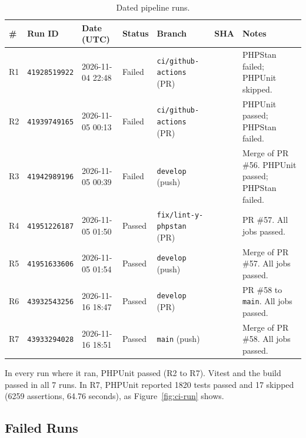 \begin{table}[H]
  \centering
  \small
  \setlength{\tabcolsep}{3pt}
  \begin{tabularx}{\linewidth}{L{0.7cm}L{2.3cm}L{2.1cm}L{1.3cm}L{2.7cm}L{1.4cm}Y}
    \toprule
    \# & Run ID & Date (UTC) & Status & Branch & SHA & Notes \\
    \midrule
    R1 & \texttt{\footnotesize 41928519922} & 2026-11-04 22:48 & Failed & \texttt{ci/}\allowbreak\texttt{github-}\allowbreak\texttt{actions} (PR) &  & PHPStan failed; PHPUnit skipped. \\
    R2 & \texttt{\footnotesize 41939749165} & 2026-11-05 00:13 & Failed & \texttt{ci/}\allowbreak\texttt{github-}\allowbreak\texttt{actions} (PR) &  & PHPUnit passed; PHPStan failed. \\
    R3 & \texttt{\footnotesize 41942989196} & 2026-11-05 00:39 & Failed & \texttt{develop} (push) &  & Merge of PR \#56. PHPUnit passed; PHPStan failed. \\
    R4 & \texttt{\footnotesize 41951226187} & 2026-11-05 01:50 & Passed & \texttt{fix/}\allowbreak\texttt{lint-y-}\allowbreak\texttt{phpstan} (PR) &  & PR \#57. All jobs passed. \\
    R5 & \texttt{\footnotesize 41951633606} & 2026-11-05 01:54 & Passed & \texttt{develop} (push) &  & Merge of PR \#57. All jobs passed. \\
    R6 & \texttt{\footnotesize 43932543256} & 2026-11-16 18:47 & Passed & \texttt{develop} (PR) &  & PR \#58 to \texttt{main}. All jobs passed. \\
    R7 & \texttt{\footnotesize 43933294028} & 2026-11-16 18:51 & Passed & \texttt{main} (push) &  & Merge of PR \#58. All jobs passed. \\
    \bottomrule
  \end{tabularx}
  \caption{Dated pipeline runs.}
  \label{tab:ci-runs}
\end{table}

In every run where it ran, PHPUnit passed (R2 to R7).
Vitest and the build passed in all 7 runs.
In R7, PHPUnit reported 1820 tests passed and 17 skipped (6259 assertions, 64.76 seconds), as Figure~\ref{fig:ci-run} shows.


\subsection{Failed Runs}

